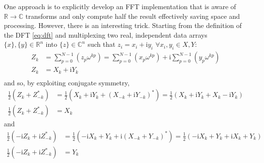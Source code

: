\documentclass{article}
\begin{document}
One approach is to explicitly develop an FFT implementation that is aware of $\mathbb{R} \rightarrow \mathbb{C}$ transforms and only compute half the result effectively saving space and processing.
However, there is an interesting trick.
Starting from the definition of the DFT \eqref{eq:dft} and multiplexing two real, independent data arrays $\{x\},\{y\} \in \mathbb{R}^n$ into $\{z\} \in \mathbb{C}^n$ such that $z_i = x_i + \mathrm {i} y_i$ $\forall x_i,y_i \in X,Y$:
%
\begin {equation}
\begin {aligned}
Z_k &= \sum_{p = 0}^{N-1} (z_p \omega^{k p}) = \sum_{p = 0}^{N-1} (x_p \omega^{k p}) + \mathrm{i} \sum_{p = 0}^{N-1} (y_p \omega^{k p}) \\
Z_k &= X_k + \mathrm{i} Y_k \\
\end {aligned}
\end {equation}
%
and so, by exploiting conjugate symmetry,
%
\begin {equation}
\begin {aligned}
\frac{1}{2} (Z_k + Z_{-k}^*) &= \frac{1}{2} (X_k + \mathrm{i} Y_k + (X_{-k} + \mathrm{i} Y_{-k})^*) = \frac{1}{2} (X_k + \mathrm{i} Y_k + X_k - \mathrm{i} Y_k) \\
\frac{1}{2} (Z_k + Z_{-k}^*) &= X_k
\end {aligned}
\end {equation}
%
and
%
\begin {equation}
\begin {aligned}
\frac{1}{2} (-\mathrm{i} Z_k + \mathrm{i} Z_{-k}^*) &= \frac{1}{2} (-\mathrm{i} X_k + Y_k + \mathrm{i} (X_{-k} + Y_{-k})^*) = \frac{1}{2} (-\mathrm{i} X_k + Y_k + \mathrm{i} X_k + Y_k) \\
\frac{1}{2} (-\mathrm{i} Z_k + \mathrm{i} Z_{-k}^*) &= Y_k
\end {aligned}
\end {equation}
%
\end{document}
